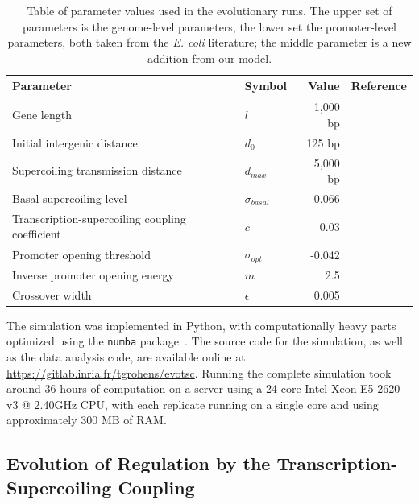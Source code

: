 \begin{table}[H]
  \begin{center}
    \begin{tabular}{ l  l  r  c }
    \toprule
    \textbf{Parameter} & \textbf{Symbol} & \textbf{Value} & \textbf{Reference} \\
    \midrule
    Gene length & $l$ & 1,000 bp & \cite{blattner1997} \\
    Initial intergenic distance & $d_0$ & 125 bp & \cite{blattner1997} \\
    Supercoiling transmission distance & $d_{max}$ & 5,000 bp & \cite{klein2021} \\
    Basal supercoiling level & $\sigma_{basal}$ & -0.066 & \cite{crozat2005} \\
    \midrule
    Transcription-supercoiling coupling coefficient & $c$ & 0.03 & \\
    \midrule
    Promoter opening threshold & $\sigma_{opt}$ & -0.042 & \cite{elhoudaigui2019} \\
    Inverse promoter opening energy & $m$ & 2.5 & \cite{elhoudaigui2019} \\
    Crossover width & $\epsilon$ & 0.005 & \cite{elhoudaigui2019} \\
    \bottomrule
    \end{tabular}
    \end{center}
  \caption{Table of parameter values used in the evolutionary runs.
  The upper set of parameters is the genome-level parameters, the lower set the promoter-level parameters, both taken from the \emph{E. coli} literature; the middle parameter is a new addition from our model.}
  \label{tab:param_values}
\end{table}

The simulation was implemented in Python, with computationally heavy parts optimized using the \texttt{numba} package~\citep{lam2015}. The source code for the simulation, as well as the data analysis code, are available online at \url{https://gitlab.inria.fr/tgrohens/evotsc}.
Running the complete simulation took around 36 hours of computation on a server using a 24-core Intel Xeon E5-2620 v3 @ 2.40GHz CPU, with each replicate running on a single core and using approximately 300 MB of RAM.

\subsection{Evolution of Regulation by the Transcription-Supercoiling Coupling}


